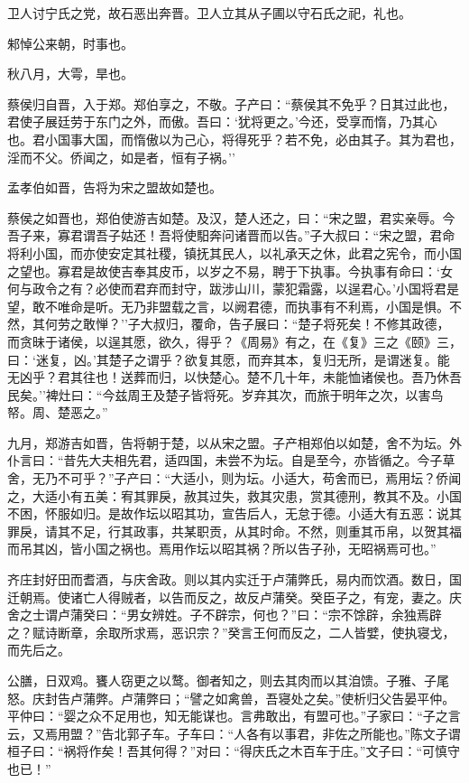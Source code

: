 \documentclass[]{article}
\begin{document}
卫人讨宁氏之党，故石恶出奔晋。卫人立其从子圃以守石氏之祀，礼也。

邾悼公来朝，时事也。

秋八月，大雩，旱也。

蔡侯归自晋，入于郑。郑伯享之，不敬。子产曰：``蔡侯其不免乎？日其过此也，君使子展廷劳于东门之外，而傲。吾曰：`犹将更之。'今还，受享而惰，乃其心也。君小国事大国，而惰傲以为己心，将得死乎？若不免，必由其子。其为君也，淫而不父。侨闻之，如是者，恒有子祸。''

孟孝伯如晋，告将为宋之盟故如楚也。

蔡侯之如晋也，郑伯使游吉如楚。及汉，楚人还之，曰：``宋之盟，君实亲辱。今吾子来，寡君谓吾子姑还！吾将使馹奔问诸晋而以告。''子大叔曰：``宋之盟，君命将利小国，而亦使安定其社稷，镇抚其民人，以礼承天之休，此君之宪令，而小国之望也。寡君是故使吉奉其皮币，以岁之不易，聘于下执事。今执事有命曰：`女何与政令之有？必使而君弃而封守，跋涉山川，蒙犯霜露，以逞君心。'小国将君是望，敢不唯命是听。无乃非盟载之言，以阙君德，而执事有不利焉，小国是惧。不然，其何劳之敢惮？''子大叔归，覆命，告子展曰：``楚子将死矣！不修其政德，而贪昧于诸侯，以逞其愿，欲久，得乎？《周易》有之，在《复》三之《颐》三，曰：`迷复，凶。'其楚子之谓乎？欲复其愿，而弃其本，复归无所，是谓迷复。能无凶乎？君其往也！送葬而归，以快楚心。楚不几十年，未能恤诸侯也。吾乃休吾民矣。''裨灶曰：``今兹周王及楚子皆将死。岁弃其次，而旅于明年之次，以害鸟帑。周、楚恶之。''

九月，郑游吉如晋，告将朝于楚，以从宋之盟。子产相郑伯以如楚，舍不为坛。外仆言曰：``昔先大夫相先君，适四国，未尝不为坛。自是至今，亦皆循之。今子草舍，无乃不可乎？''子产曰：``大适小，则为坛。小适大，苟舍而已，焉用坛？侨闻之，大适小有五美：宥其罪戾，赦其过失，救其灾患，赏其德刑，教其不及。小国不困，怀服如归。是故作坛以昭其功，宣告后人，无怠于德。小适大有五恶：说其罪戾，请其不足，行其政事，共某职贡，从其时命。不然，则重其币帛，以贺其福而吊其凶，皆小国之祸也。焉用作坛以昭其祸？所以告子孙，无昭祸焉可也。''

齐庄封好田而耆酒，与庆舍政。则以其内实迁于卢蒲弊氏，易内而饮酒。数日，国迁朝焉。使诸亡人得贼者，以告而反之，故反卢蒲癸。癸臣子之，有宠，妻之。庆舍之士谓卢蒲癸曰：``男女辨姓。子不辟宗，何也？''曰：``宗不馀辟，余独焉辟之？赋诗断章，余取所求焉，恶识宗？''癸言王何而反之，二人皆嬖，使执寝戈，而先后之。

公膳，日双鸡。饔人窃更之以鹜。御者知之，则去其肉而以其洎馈。子雅、子尾怒。庆封告卢蒲弊。卢蒲弊曰；``譬之如禽兽，吾寝处之矣。''使析归父告晏平仲。平仲曰：``婴之众不足用也，知无能谋也。言弗敢出，有盟可也。''子家曰：``子之言云，又焉用盟？''告北郭子车。子车曰：``人各有以事君，非佐之所能也。''陈文子谓桓子曰：``祸将作矣！吾其何得？''对曰：``得庆氏之木百车于庄。''文子曰：``可慎守也已！''
\end{document}
